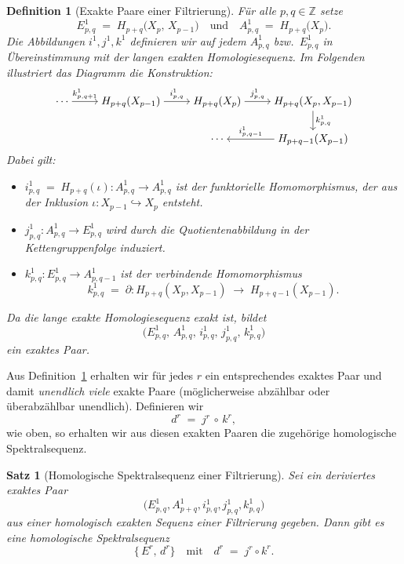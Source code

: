 \documentclass[12pt, hidelinks]{article}
\numberwithin{conj}{section}
\newtheorem{definition}[conj]{Definition}
\newtheorem{theorem}[conj]{Satz}
\newcommand{\Z}{\mathbb{Z}}
\begin{document}
\begin{definition}[Exakte Paare einer Filtrierung]\label{exaktFiltration}
    Für alle $p,q \in \Z$ setze
    \[
        E^1_{p,q} \;=\; H_{p+q}\bigl(X_p,\,X_{p-1}\bigr)
        \quad\text{und}\quad
        A^1_{p,q} \;=\; H_{p+q}\bigl(X_p\bigr).
    \]
    Die Abbildungen $i^1, j^1, k^1$ definieren wir auf jedem $A^1_{p,q}$ bzw.\ $E^1_{p,q}$ in Übereinstimmung mit der langen exakten Homologiesequenz. Im Folgenden illustriert das Diagramm die Konstruktion:
    \[
        \begin{tikzcd}[cramped]
            \cdots & H_{p+q}(X_{p-1}) & H_{p+q}(X_{p}) & H_{p+q}(X_{p},X_{p-1}) \\
            & {} & \cdots & H_{p+q-1}(X_{p-1})
            \arrow["{k^1_{p,q+1}}", from=1-1, to=1-2]
            \arrow["{i^1_{p,q}}", from=1-2, to=1-3]
            \arrow["{j^1_{p,q}}", from=1-3, to=1-4]
            \arrow["{k^1_{p,q}}", from=1-4, to=2-4]
            \arrow["{i^1_{p,q-1}}"', from=2-4, to=2-3]
        \end{tikzcd}
    \]
    Dabei gilt:
    \begin{itemize}[nolistsep]
        \item $i^1_{p,q} \;=\; H_{p+q}(\iota) : A^1_{p,q} \to A^1_{p,q}$ ist der funktorielle Homomorphismus, der aus der Inklusion 
              \(\iota: X_{p-1} \hookrightarrow X_p\) entsteht.
        \item $j^1_{p,q} : A^1_{p,q} \to E^1_{p,q}$ wird durch die Quotientenabbildung in der Kettengruppenfolge induziert.
        \item $k^1_{p,q} : E^1_{p,q} \to A^1_{p,q-1}$ ist der \emph{verbindende Homomorphismus}
              \[
                k^1_{p,q} \;=\; \partial : H_{p+q}(X_p,X_{p-1}) \;\longrightarrow\; H_{p+q-1}(X_{p-1}).
              \]
    \end{itemize}
    Da die lange exakte Homologiesequenz exakt ist, bildet
    \[
        \bigl(E^1_{p,q},\,A^1_{p,q},\,i^1_{p,q},\,j^1_{p,q},\,k^1_{p,q}\bigr)
    \]
    ein \emph{exaktes Paar}.
\end{definition}

Aus Definition~\ref{exaktFiltration} erhalten wir für jedes $r$ ein entsprechendes exaktes Paar und damit \emph{unendlich viele} exakte Paare (möglicherweise abzählbar oder überabzählbar unendlich). Definieren wir 
\[
    d^r \;=\; j^r \,\circ\, k^r,
\]
wie oben, so erhalten wir aus diesen exakten Paaren die zugehörige homologische Spektralsequenz.

\begin{theorem}[Homologische Spektralsequenz einer Filtrierung]
    Sei ein deriviertes exaktes Paar
    \[
        \bigl(E^1_{p,q}, A^1_{p+q}, i^1_{p,q}, j^1_{p,q}, k^1_{p,q}\bigr)
    \]
    aus einer homologisch exakten Sequenz einer Filtrierung gegeben. Dann gibt es eine homologische Spektralsequenz
    \[
        \{\,E^r,\,d^r\}\quad\text{mit}\quad d^r \;=\; j^r \circ k^r.
    \]
\end{theorem}
\end{document}
